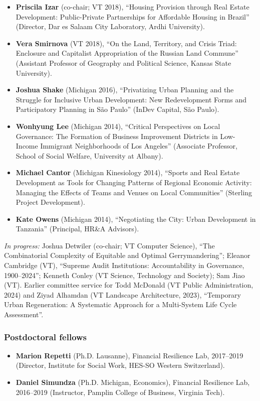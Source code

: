 \documentclass[letter,11pt]{article}
\begin{document}
\begin{itemize}[--]
\item \textbf{Priscila Izar} (co-chair; VT 2018), \enquote{Housing Provision through Real Estate Development: Public-Private Partnerships for Affordable Housing in Brazil} (Director, Dar es Salaam City Laboratory, Ardhi University).
\item \textbf{Vera Smirnova} (VT 2018), \enquote{On the Land, Territory, and Crisis Triad: Enclosure and Capitalist Appropriation of the Russian Land Commune} (Assistant Professor of Geography and Political Science, Kansas State University).
\item \textbf{Joshua Shake} (Michigan 2016), \enquote{Privatizing Urban Planning and the Struggle for Inclusive Urban Development: New Redevelopment Forms and Participatory Planning in S\~{a}o Paulo} (InDev Capital, S\~{a}o Paulo).
\item \textbf{Wonhyung Lee} (Michigan 2014), \enquote{Critical Perspectives on Local Governance: The Formation of Business Improvement Districts in Low-Income Immigrant Neighborhoods of Los Angeles} (Associate Professor, School of Social Welfare, University at Albany).
\item \textbf{Michael Cantor} (Michigan Kinesiology 2014), \enquote{Sports and Real Estate Development as Tools for Changing Patterns of Regional Economic Activity: Managing the Effects of Teams and Venues on Local Communities} (Sterling Project Development).
\item \textbf{Kate Owens} (Michigan 2014), \enquote{Negotiating the City: Urban Development in Tanzania} (Principal, HR\&A Advisors).
\end{itemize}
\noindent\emph{In progress:} Joshua Detwiler (co-chair; VT Computer Science), \enquote{The Combinatorial Complexity of Equitable and Optimal Gerrymandering}; Eleanor Cambridge (VT), \enquote{Supreme Audit Institutions: Accountability in Governance, 1900--2024}; Kenneth Conley (VT Science, Technology and Society); Sam Jiao (VT). Earlier committee service for Todd McDonald (VT Public Administration, 2024) and Ziyad Alhamdan (VT Landscape Architecture, 2023), \enquote{Temporary Urban Regeneration: A Systematic Approach for a Multi-System Life Cycle Assessment}.

\subsubsection*{Postdoctoral fellows}
\begin{itemize}[--]
\itemsep0em
\item \textbf{Marion Repetti} (Ph.D. Lausanne), Financial Resilience Lab, 2017--2019 (Director, Institute for Social Work, HES-SO Western Switzerland).
\item \textbf{Daniel Simundza} (Ph.D. Michigan, Economics), Financial Resilience Lab, 2016--2019 (Instructor, Pamplin College of Business, Virginia Tech).
\end{itemize}
\end{document}
